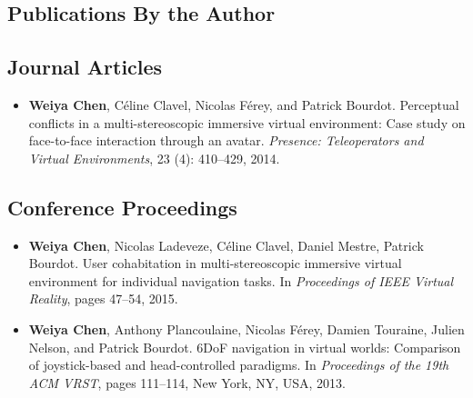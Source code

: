\begin{appendices}
\chapter{Publications By the Author}
\section*{Journal Articles}

\begin{itemize}
\item \textbf{Weiya Chen}, C\'eline Clavel, Nicolas F\'erey, and Patrick Bourdot. Perceptual conflicts in a multi-stereoscopic immersive virtual environment: Case study on face-to-face interaction through an avatar. \textit{Presence: Teleoperators and Virtual Environments}, 23 (4): 410–429, 2014.
\end{itemize}


\section*{Conference Proceedings}

\begin{itemize}
\item \textbf{Weiya Chen}, Nicolas Ladeveze, C\'eline Clavel, Daniel Mestre, Patrick Bourdot. User cohabitation in multi-stereoscopic immersive virtual environment for individual navigation tasks. In \textit{Proceedings of IEEE Virtual Reality}, pages 47–54, 2015.

\item \textbf{Weiya Chen}, Anthony Plancoulaine, Nicolas F\'erey, Damien Touraine, Julien Nelson, and Patrick Bourdot. 6DoF navigation in virtual worlds: Comparison of joystick-based and head-controlled paradigms. In \textit{Proceedings of the 19th ACM VRST}, pages 111–114, New York, NY, USA, 2013.
\end{itemize}





\end{appendices}
